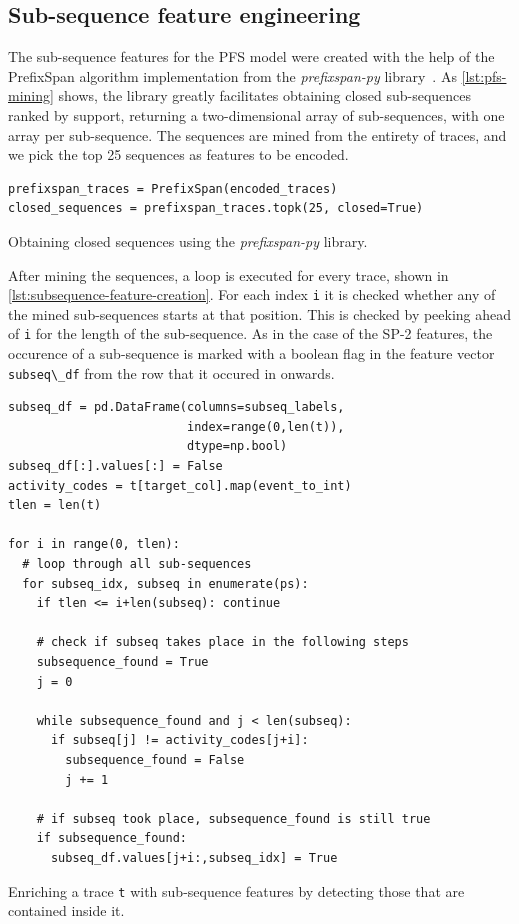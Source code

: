 \subsection*{Sub-sequence feature engineering}
The sub-sequence features for the PFS model were created with the help of the PrefixSpan algorithm implementation from the \textit{prefixspan-py} library~\cite{web:prefixspan-py}. As \autoref{lst:pfs-mining} shows, the library greatly facilitates obtaining closed sub-sequences ranked by support, returning a two-dimensional array of sub-sequences, with one array per sub-sequence. The sequences are mined from the entirety of traces, and we pick the top 25 sequences as features to be encoded.

\begin{listing}[ht]
\begin{verbatim}
prefixspan_traces = PrefixSpan(encoded_traces)
closed_sequences = prefixspan_traces.topk(25, closed=True)
\end{verbatim}
\caption{Obtaining closed sequences using the \textit{prefixspan-py} library.}
\label{lst:pfs-mining}
\end{listing}

After mining the sequences, a loop is executed for every trace, shown in \autoref{lst:subsequence-feature-creation}. For each index \verb=i= it is checked whether any of the mined sub-sequences starts at that position. This is checked by peeking ahead of \verb=i= for the length of the sub-sequence. As in the case of the SP-2 features, the occurence of a sub-sequence is marked with a boolean flag in the feature vector \verb=subseq\_df= from the row that it occured in onwards.

\begin{listing}[ht]
\begin{verbatim}
subseq_df = pd.DataFrame(columns=subseq_labels,
                         index=range(0,len(t)),
                         dtype=np.bool)
subseq_df[:].values[:] = False
activity_codes = t[target_col].map(event_to_int)
tlen = len(t)

for i in range(0, tlen):
  # loop through all sub-sequences
  for subseq_idx, subseq in enumerate(ps):
    if tlen <= i+len(subseq): continue

    # check if subseq takes place in the following steps
    subsequence_found = True
    j = 0

    while subsequence_found and j < len(subseq):
      if subseq[j] != activity_codes[j+i]:
        subsequence_found = False
        j += 1

    # if subseq took place, subsequence_found is still true
    if subsequence_found:
      subseq_df.values[j+i:,subseq_idx] = True
\end{verbatim}
\caption{Enriching a trace \texttt{t} with sub-sequence features by detecting those that are contained inside it.}
\label{lst:subsequence-feature-creation}
\end{listing}

